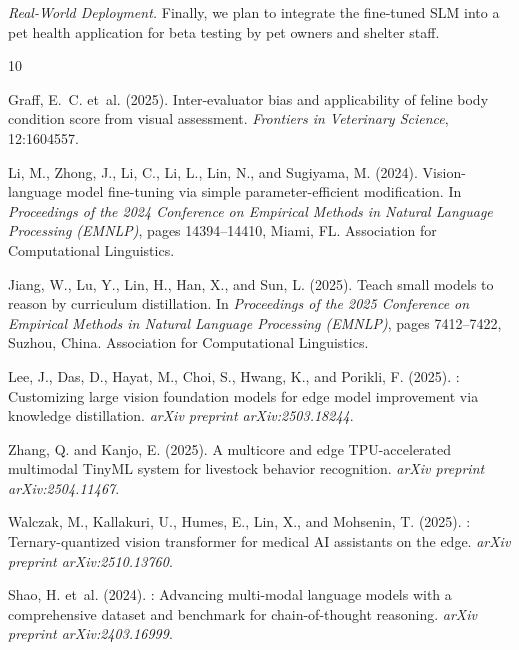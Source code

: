 \documentclass[11pt,twocolumn]{article}
\begin{document}
\textit{Real-World Deployment.} Finally, we plan to integrate the fine-tuned SLM into a pet health application for beta testing by pet owners and shelter staff.


\begin{thebibliography}{10}

Graff, E.~C. et~al. (2025).
\newblock Inter-evaluator bias and applicability of feline body condition score
  from visual assessment.
\newblock \emph{Frontiers in Veterinary Science}, 12:1604557.
\newblock {}

Li, M., Zhong, J., Li, C., Li, L., Lin, N., and Sugiyama, M. (2024).
\newblock Vision-language model fine-tuning via simple parameter-efficient
  modification.
\newblock In \emph{Proceedings of the 2024 Conference on Empirical Methods in
  Natural Language Processing (EMNLP)}, pages 14394--14410, Miami, FL.
\newblock Association for Computational Linguistics.

Jiang, W., Lu, Y., Lin, H., Han, X., and Sun, L. (2025).
\newblock Teach small models to reason by curriculum distillation.
\newblock In \emph{Proceedings of the 2025 Conference on Empirical Methods in
  Natural Language Processing (EMNLP)}, pages 7412--7422, Suzhou, China.
\newblock Association for Computational Linguistics.

Lee, J., Das, D., Hayat, M., Choi, S., Hwang, K., and Porikli, F. (2025).
: Customizing large vision foundation models for edge model
  improvement via knowledge distillation.
\newblock \emph{arXiv preprint arXiv:2503.18244}.

Zhang, Q. and Kanjo, E. (2025).
\newblock A multicore and edge {TPU}-accelerated multimodal {TinyML} system
  for livestock behavior recognition.
\newblock \emph{arXiv preprint arXiv:2504.11467}.

Walczak, M., Kallakuri, U., Humes, E., Lin, X., and Mohsenin, T. (2025).
: Ternary-quantized vision transformer for medical {AI}
  assistants on the edge.
\newblock \emph{arXiv preprint arXiv:2510.13760}.

Shao, H. et~al. (2024).
: Advancing multi-modal language models with a
  comprehensive dataset and benchmark for chain-of-thought reasoning.
\newblock \emph{arXiv preprint arXiv:2403.16999}.


\end{thebibliography}
\end{document}
